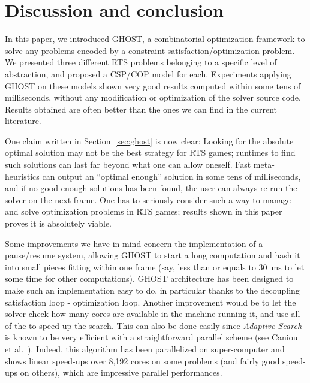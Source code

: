 \documentclass[journal]{IEEEtran}
\newcommand{\csp}{\textsc{CSP}\xspace}
\newcommand{\cop}{\textsc{COP}\xspace}
\newcommand{\ghost}{\textsc{GHOST}\xspace}
\begin{document}
\section{Discussion and conclusion}\label{sec:conclusion}

In  this paper,  we  introduced \ghost,  a combinatorial  optimization
framework   to    solve   any   problems   encoded    by   a   constraint
satisfaction/optimization problem.   We presented three  different RTS
problems belonging to a specific  level of abstraction, and proposed a
\csp/\cop model for each. Experiments  applying \ghost on these models
shown very  good results  computed within  some tens  of milliseconds,
without  any  modification  or   optimization  of  the  solver  source
code. Results obtained  are often better than the ones  we can find in
the current literature.

One claim written in Section~\ref{sec:ghost} is now clear: Looking for
the absolute  optimal solution may  not be  the best strategy  for RTS
games; runtimes  to find such solutions  can last far beyond  what one
can  allow  oneself.  Fast  meta-heuristics  can  output an  ``optimal
enough'' solution in some tens of  milliseconds, and if no good enough
solutions has been found, the user can always re-run the solver on the
next frame.   One has to seriously  consider such a way  to manage and
solve optimization problems in RTS  games; results shown in this paper
proves it is absolutely viable.


Some  improvements we  have in  mind concern  the implementation  of a
pause/resume system, allowing  \ghost to start a  long computation and
hash it into small pieces fitting  within one frame (say, less than or
equals  to 30~ms  to let  some  time for  other computations).   \ghost
architecture has been designed to  make such an implementation easy to
do,  in  particular  thanks  to the  decoupling  satisfaction  loop  -
optimization  loop. Another  improvement would  be to  let the  solver
check how many cores are available  in the machine running it, and use
all of the to speed up the  search. This can also be done easily since
{\it  Adaptive  Search}   is  known  to  be  very   efficient  with  a
straightforward      parallel      scheme     (see      Caniou      et
al.~\cite{Caniou14}). Indeed, this algorithm  has been parallelized on
super-computer and  shows linear  speed-ups over  8,192 cores  on some
problems (and fairly  good speed-ups on others),  which are impressive
parallel performances.
\end{document}
